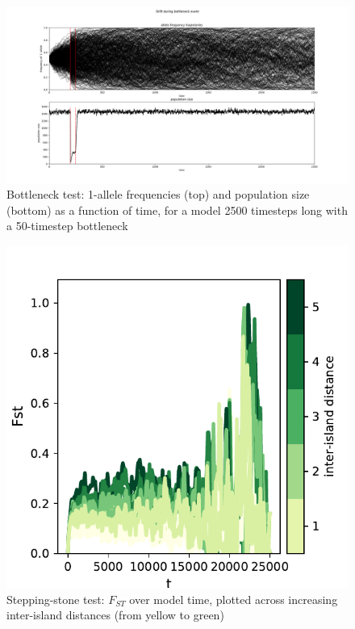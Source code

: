 ﻿\documentclass{article}
\begin{document}
\begin{figure}[ht!]
\includegraphics[width=175mm]{./img/validation/bottleneck/alleles_seem_to_take_too_long_to_fix.png}
        \caption{Bottleneck test: 1-allele frequencies (top)
                 and population size (bottom) as a function of time,
                 for a model 2500 timesteps long with a 50-timestep bottleneck}
        \label{fig:bottleneck}
\end{figure}


\begin{figure}[ht!]
        \includegraphics[width=175mm]{./img/final/STEPPING_STONE_Fst_over_time}
        \caption{Stepping-stone test: $F_{ST}$ over model time,
                 plotted across increasing inter-island distances
                 (from yellow to green)}
        \label{fig:stepstone_Fst_by_dist}
\end{figure}
\end{document}
